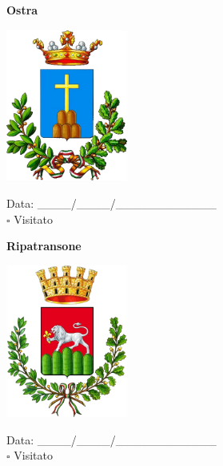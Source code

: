 \documentclass[a5paper,12pt]{article}
\begin{document}
\vspace{0.7cm}

\noindent
\begin{minipage}[t]{0.45\textwidth}
    \begin{center}
        \textbf{Ostra}
    \end{center}
    \vspace{-0.5cm} %
    \begin{center}
        \includegraphics[height= 5cm, width=4cm]{Marche/Stemma Ostra.png}
    \end{center}
    \vspace{-0.4cm} %
    \begin{flushleft}
        Data: \_\_\_\_/\_\_\_\_/\_\_\_\_\_\_\_\_\_\_\_\_ \\
        $\square$ Visitato
    \end{flushleft}
\end{minipage}
\hfill
\noindent
\begin{minipage}[t]{0.45\textwidth}
    \begin{center}
        \textbf{Ripatransone}
    \end{center}
    \vspace{-0.5cm} %
    \begin{center}
        \includegraphics[height= 5cm, width=4cm]{Marche/Stemma Ripatransone.png}
    \end{center}
    \vspace{-0.4cm} %
    \begin{flushleft}
        Data: \_\_\_\_/\_\_\_\_/\_\_\_\_\_\_\_\_\_\_\_\_ \\
        $\square$ Visitato
    \end{flushleft}
\end{minipage}
\end{document}
